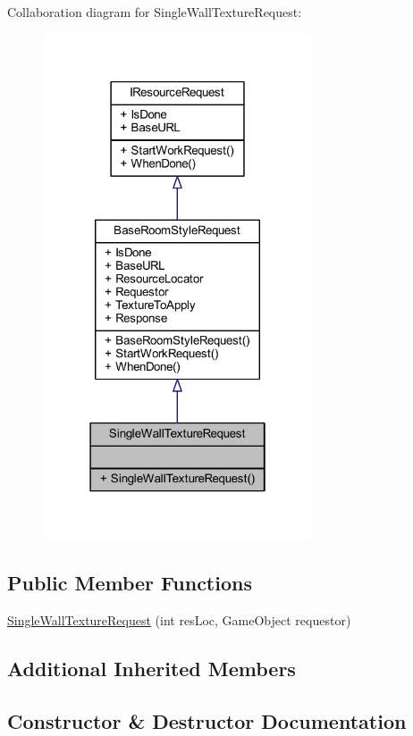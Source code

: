 Collaboration diagram for Single\+Wall\+Texture\+Request\+:
\nopagebreak
\begin{figure}[H]
\begin{center}
\leavevmode
\includegraphics[width=226pt]{class_single_wall_texture_request__coll__graph}
\end{center}
\end{figure}
\subsection*{Public Member Functions}
\begin{DoxyCompactItemize}
\item 
\mbox{\hyperlink{class_single_wall_texture_request_a9d59a7b31bb0a9ebc426f698d8b6a591}{Single\+Wall\+Texture\+Request}} (int res\+Loc, Game\+Object requestor)
\end{DoxyCompactItemize}
\subsection*{Additional Inherited Members}


\subsection{Constructor \& Destructor Documentation}
\mbox{\label{class_single_wall_texture_request_a9d59a7b31bb0a9ebc426f698d8b6a591}} 
